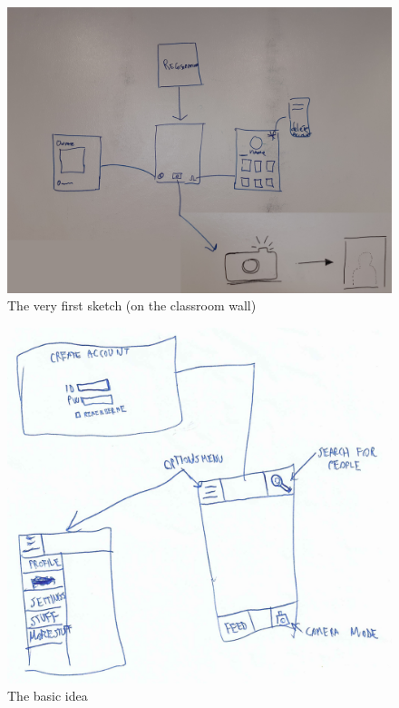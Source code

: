\documentclass[12pt]{scrartcl}
\begin{document}
	\begin{figure}[H]
        		\centering
       		\includegraphics[width=\textwidth]{../images/design1.jpg}
       		\caption{The very first sketch (on the classroom wall)}
        		\label{sketch1}
	\end{figure}
	
	\begin{figure}[H]
        		\centering
       		\includegraphics[width=\textwidth]{../images/design2.jpg}
       		\caption{The basic idea}
        		\label{sketch2}
	\end{figure}
	
\end{document}
